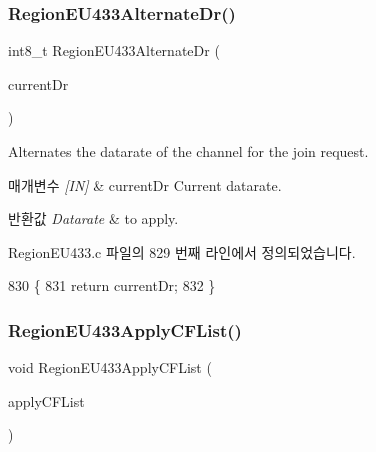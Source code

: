 \subsubsection{\texorpdfstring{Region\+E\+U433\+Alternate\+Dr()}{RegionEU433AlternateDr()}}
{\footnotesize\ttfamily int8\+\_\+t Region\+E\+U433\+Alternate\+Dr (\begin{DoxyParamCaption}\item[{int8\+\_\+t}]{current\+Dr }\end{DoxyParamCaption})}



Alternates the datarate of the channel for the join request. 


\begin{DoxyParams}{매개변수}
{\em \mbox{[}\+I\+N\mbox{]}} & current\+Dr Current datarate.\\
\hline
\end{DoxyParams}

\begin{DoxyRetVals}{반환값}
{\em Datarate} & to apply. \\
\hline
\end{DoxyRetVals}


Region\+E\+U433.\+c 파일의 829 번째 라인에서 정의되었습니다.


\begin{DoxyCode}
830 \{
831     \textcolor{keywordflow}{return} currentDr;
832 \}
\end{DoxyCode}
\mbox{\label{group___r_e_g_i_o_n_e_u433_gacf5995b949053267e507f4e2063fc7bf}} 
\subsubsection{\texorpdfstring{Region\+E\+U433\+Apply\+C\+F\+List()}{RegionEU433ApplyCFList()}}
{\footnotesize\ttfamily void Region\+E\+U433\+Apply\+C\+F\+List (\begin{DoxyParamCaption}\item[{\mbox{\hyperlink{group___r_e_g_i_o_n_ga71588e9ad07e34b78fa91d51881fd3c6}{Apply\+C\+F\+List\+Params\+\_\+t}} $\ast$}]{apply\+C\+F\+List }\end{DoxyParamCaption})}



